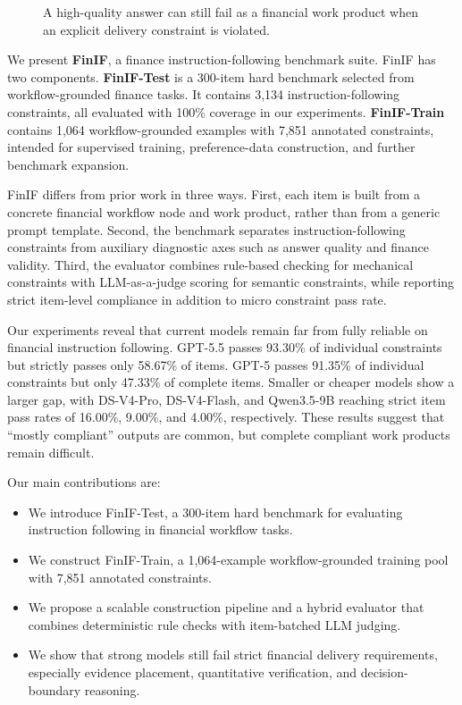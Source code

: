 \begin{figure}[t]
  \centering
  \caption{A high-quality answer can still fail as a financial work product when an explicit delivery constraint is violated.}
  \label{fig:case}
\end{figure}

We present \textbf{FinIF}, a finance instruction-following benchmark suite.
FinIF has two components.
\textbf{FinIF-Test} is a 300-item hard benchmark selected from workflow-grounded finance tasks.
It contains 3,134 instruction-following constraints, all evaluated with 100\% coverage in our experiments.
\textbf{FinIF-Train} contains 1,064 workflow-grounded examples with 7,851 annotated constraints, intended for supervised training, preference-data construction, and further benchmark expansion.

FinIF differs from prior work in three ways.
First, each item is built from a concrete financial workflow node and work product, rather than from a generic prompt template.
Second, the benchmark separates instruction-following constraints from auxiliary diagnostic axes such as answer quality and finance validity.
Third, the evaluator combines rule-based checking for mechanical constraints with LLM-as-a-judge scoring for semantic constraints, while reporting strict item-level compliance in addition to micro constraint pass rate.

Our experiments reveal that current models remain far from fully reliable on financial instruction following.
GPT-5.5 passes 93.30\% of individual constraints but strictly passes only 58.67\% of items.
GPT-5 passes 91.35\% of individual constraints but only 47.33\% of complete items.
Smaller or cheaper models show a larger gap, with DS-V4-Pro, DS-V4-Flash, and Qwen3.5-9B reaching strict item pass rates of 16.00\%, 9.00\%, and 4.00\%, respectively.
These results suggest that ``mostly compliant'' outputs are common, but complete compliant work products remain difficult.

Our main contributions are:
\begin{itemize}
    \item We introduce FinIF-Test, a 300-item hard benchmark for evaluating instruction following in financial workflow tasks.
    \item We construct FinIF-Train, a 1,064-example workflow-grounded training pool with 7,851 annotated constraints.
    \item We propose a scalable construction pipeline and a hybrid evaluator that combines deterministic rule checks with item-batched LLM judging.
    \item We show that strong models still fail strict financial delivery requirements, especially evidence placement, quantitative verification, and decision-boundary reasoning.
\end{itemize}
